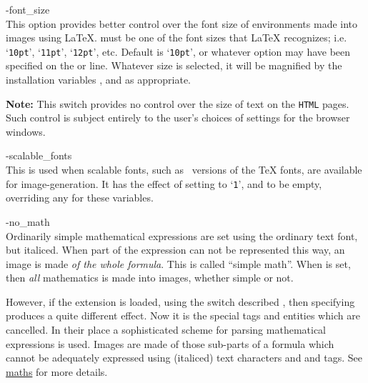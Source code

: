 \begin{htmllist}
\begin{changebar}
%
%

\item [ -font\_size \Meta{size}\label{fontsize}]
\\
This option provides better control
over the font size of environments made into images using \LaTeX.
 must be one of the font sizes that \LaTeX{} recognizes;
i.e. `\texttt{10pt}', `\texttt{11pt}', `\texttt{12pt}', etc.
Default is `\texttt{10pt}', or whatever option may have been specified on the
 or  line.\html{\\}
Whatever size is selected, it will be magnified by the installation variables
, 
and  as appropriate.

\smallskip\noindent
\textbf{Note: }This switch provides no control over the size of text
on the \texttt{HTML} pages.
Such control is subject entirely to the user's choices
of settings for the browser windows.
\end{changebar}%

%

\begin{changebar}
\item [ -scalable\_fonts\label{scalefonts}]
\\
This is used when scalable fonts, such as \PS\ versions
of the \TeX{} fonts, are available for image-generation.\html{\\}
It has the effect of setting  to `\texttt{1}',
and  to be empty,
overriding any  for these variables.

%

\item [ -no\_math\label{nomath}]
\\
Ordinarily simple mathematical expressions are set using the ordinary text font,
but italiced. When part of the expression can not be represented this way,
an image is made \emph{of the whole formula}.
This is called ``simple math''.
When  is set,
then \emph{all} mathematics is made into images, whether simple or not.

However, if the  extension is loaded,
using the  switch described ,
then specifying  produces a quite different effect.
Now it is the special  tags and entities which are cancelled.
In their place a sophisticated scheme for parsing mathematical expressions
is used. Images are made of those sub-parts of a formula which cannot be
adequately expressed using (italiced) text characters and  and
 tags.
See \hyperref{the subsection on mathematics}{Section~}{}{maths} for more details.


\end{changebar}
\end{htmllist}

